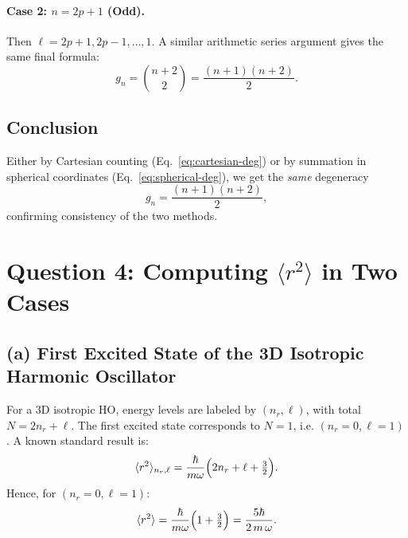 \documentclass[12pt]{article}
\begin{document}
\paragraph{Case 2: $n=2p+1$ (Odd).}\quad Then \(\ell = 2p+1, 2p-1, \dots, 1\). A similar arithmetic series argument gives the same final formula:
\[
 g_n = \binom{n+2}{2} = \frac{(n+1)(n+2)}{2}.
\]

\subsection*{Conclusion}
Either by Cartesian counting (Eq.~\ref{eq:cartesian-deg}) or by summation in spherical coordinates (Eq.~\ref{eq:spherical-deg}), we get the \emph{same} degeneracy
\begin{equation}
\boxed{g_n = \frac{(n+1)(n+2)}{2},}
\end{equation}
confirming consistency of the two methods.







\section*{Question 4: Computing $\langle r^2 \rangle$ in Two Cases}
\subsection*{(a) First Excited State of the 3D Isotropic Harmonic Oscillator}
For a 3D isotropic HO, energy levels are labeled by $(n_r,\ell)$, with total $N = 2n_r + \ell$. The first excited state corresponds to $N=1$, i.e. $(n_r=0,\ell=1)$. A known standard result is:
\begin{equation}
\langle r^2 \rangle_{n_r,\ell} = \frac{\hbar}{m\omega}\Bigl(2n_r + \ell + \tfrac{3}{2}\Bigr).
\end{equation}
Hence, for $(n_r=0,\ell=1)$:
\begin{equation}
\langle r^2 \rangle = \frac{\hbar}{m\omega}\Bigl(1 + \tfrac{3}{2}\Bigr) = \frac{5\hbar}{2\,m\,\omega}.
\end{equation}
\end{document}
